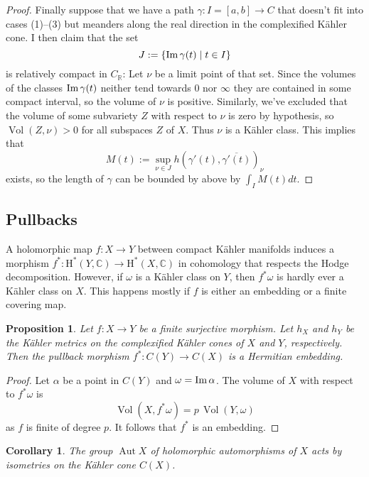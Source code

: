 \documentclass[11pt,a4paper]{amsart}
\newtheorem{prop}[theo]{Proposition}
\newtheorem{coro}[theo]{Corollary}
\theoremstyle{definition}
\theoremstyle{remark}
\newcommand{\RR}{\mathbb{R}}
\newcommand{\CC}{\mathbb{C}}
\newcommand{\Aut}{\mathop{\mathrm{Aut}}}
\newcommand{\Vol}{\mathop{\mathrm{Vol}}}
\def\Im{\mathop{\rm Im}}
\def\ov#1{\overline{#1}}
\def\coho#1{\mathrm{H}^{#1}}
\def\kf{\omega}
\def\ckf{\alpha}
\def\KC{C}
\begin{document}
\begin{proof}
Finally suppose that we have a path $\gamma : I = [a,b] \to C$ that
doesn't fit into cases (1)--(3) but meanders along the real direction in
the complexified K\"{a}hler cone. I then claim that the set
$$
J := \{ \Im \gamma(t) \mid t \in I \}
$$
is relatively compact in $C_{\RR}$: Let $\nu$ be a limit point of that
set. Since the volumes of the classes $\Im \gamma(t)$ neither tend
towards $0$ nor $\infty$ they are contained in some compact interval, so
the volume of $\nu$ is positive. Similarly, we've excluded that the
volume of some subvariety $Z$ with respect to $\nu$ is zero by
hypothesis, so $\Vol(Z,\nu) > 0$ for all subspaces $Z$ of $X$. Thus
$\nu$ is a K\"{a}hler class. 
This implies that
$$
M(t) := \sup_{\nu \in J} h(\gamma'(t),\ov{\gamma'(t)})_{\nu}
$$
exists, so the length of $\gamma$ can be bounded by above by
$\int_I M(t) dt$.
\end{proof}

\subsection*{Pullbacks}

A holomorphic map $f : X \to Y$ between compact K\"{a}hler manifolds induces
a morphism $f^* : \coho{*}(Y,\CC) \to \coho{*}(X,\CC)$ in cohomology
that respects the Hodge decomposition. However, if $\kf$ is a K\"{a}hler
class on $Y$, then $f^*\kf$ is hardly ever a K\"{a}hler class on $X$. This
happens mostly if $f$ is either an embedding or a finite covering map.

\begin{prop}
Let $f : X \to Y$ be a finite surjective morphism. Let $h_X$ and $h_Y$
be the K\"{a}hler metrics on the complexified K\"{a}hler cones of $X$ and
$Y$, respectively. Then the pullback morphism $f^* : \KC(Y) \to \KC(X)$
is a Hermitian embedding.
\end{prop}

\begin{proof}
Let $\ckf$ be a point in $\KC(Y)$ and $\kf = \Im \ckf$. The volume of
$X$ with respect to $f^*\kf$ is
\begin{equation*}
  \Vol(X,f^*\kf) = p \, \Vol(Y,\kf)
\end{equation*}
as $f$ is finite of degree $p$. It follows that $f^*$ is an embedding.
\end{proof}

\begin{coro}
The group $\Aut X$ of holomorphic automorphisms of $X$ acts by
isometries on the K\"{a}hler cone $\KC(X)$.
\end{coro}
\end{document}
